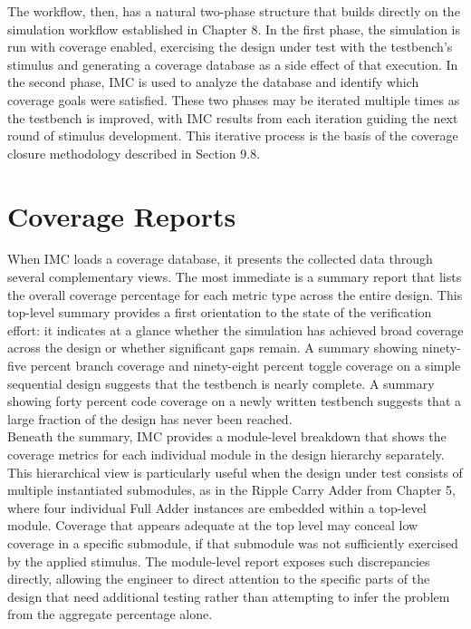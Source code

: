 The workflow, then, has a natural two-phase structure that builds directly on the simulation workflow established in Chapter 8. In the first phase, the simulation is run with coverage enabled, exercising the design under test with the testbench's stimulus and generating a coverage database as a side effect of that execution. In the second phase, IMC is used to analyze the database and identify which coverage goals were satisfied. These two phases may be iterated multiple times as the testbench is improved, with IMC results from each iteration guiding the next round of stimulus development. This iterative process is the basis of the coverage closure methodology described in Section 9.8.\\

\section{Coverage Reports}
\label{sec:coverage-reports}

When IMC loads a coverage database, it presents the collected data through several complementary views. The most immediate is a summary report that lists the overall coverage percentage for each metric type across the entire design. This top-level summary provides a first orientation to the state of the verification effort: it indicates at a glance whether the simulation has achieved broad coverage across the design or whether significant gaps remain. A summary showing ninety-five percent branch coverage and ninety-eight percent toggle coverage on a simple sequential design suggests that the testbench is nearly complete. A summary showing forty percent code coverage on a newly written testbench suggests that a large fraction of the design has never been reached.\\

Beneath the summary, IMC provides a module-level breakdown that shows the coverage metrics for each individual module in the design hierarchy separately. This hierarchical view is particularly useful when the design under test consists of multiple instantiated submodules, as in the Ripple Carry Adder from Chapter 5, where four individual Full Adder instances are embedded within a top-level module. Coverage that appears adequate at the top level may conceal low coverage in a specific submodule, if that submodule was not sufficiently exercised by the applied stimulus. The module-level report exposes such discrepancies directly, allowing the engineer to direct attention to the specific parts of the design that need additional testing rather than attempting to infer the problem from the aggregate percentage alone.\\

